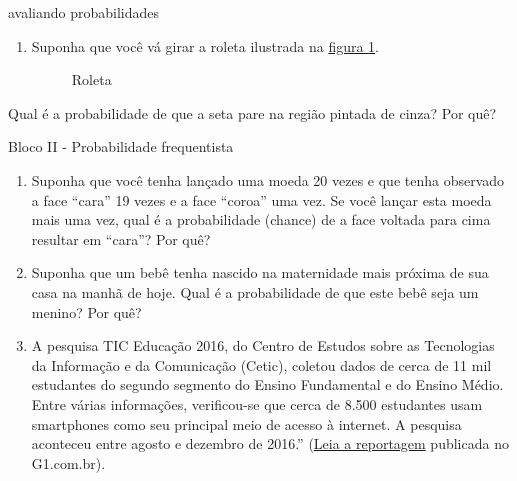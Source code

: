 \begin{task}{avaliando probabilidades}
\begin{enumerate}
\item {} 
Suponha que você vá girar a roleta ilustrada na \hyperref[roleta]{figura \ref{roleta}}.

\begin{figure}[H]
\centering

\caption{Roleta}
\label{roleta}
\end{figure}


\end{enumerate}

Qual é a probabilidade de que a seta pare na região pintada de cinza? Por quê?

Bloco II - Probabilidade frequentista
\begin{enumerate}
\item {} 
Suponha que você tenha lançado uma moeda 20 vezes e que tenha observado a face “cara” 19 vezes e a face “coroa” uma vez. Se você lançar esta moeda mais uma vez, qual é a probabilidade (chance) de a face voltada para cima resultar em “cara”? Por quê?

\item {} 
Suponha que um bebê tenha nascido na maternidade mais próxima de sua casa na manhã de hoje. Qual é a probabilidade de que este bebê seja um menino? Por quê?

\item {} 
A pesquisa TIC Educação 2016, do Centro de Estudos sobre as Tecnologias da Informação e da Comunicação (Cetic), coletou dados de cerca de 11 mil estudantes do segundo segmento do Ensino Fundamental e do Ensino Médio. Entre várias informações, verificou-se que cerca de 8.500 estudantes usam smartphones como seu principal meio de acesso à internet. A pesquisa aconteceu entre agosto e dezembro de 2016.” (\href{https://g1.globo.com/educacao/noticia/52-das-instituicoes-de-educacao-basica-usam-celular-em-atividades-escolares-aponta-estudo-da-cetic.ghtml}{Leia a reportagem} publicada no G1.com.br).

\end{enumerate}


\end{task}
